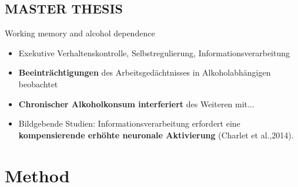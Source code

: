 \documentclass{bredelebeamer}
\begin{document}
\subsection{MASTER THESIS}
	\begin{frame}{Working memory and alcohol dependence}

	\begin{itemize}
	\item Exekutive Verhaltenskontrolle, Selbstregulierung, Informationsverarbeitung
  	\item \textbf{Beeinträchtigungen} des Arbeitsgedächtnisses in Alkoholabhängigen beobachtet
  	  	\item \textbf {Chronischer Alkoholkonsum interferiert} des Weiteren mit...
  	 \item Bildgebende Studien: Informationsverarbeitung erfordert eine \textbf{kompensierende erhöhte neuronale Aktivierung} (Charlet et al.,2014\cite{Charlet.2014}).
 		\end{itemize}
 		\cite{Crews.2005} \cite{Dougherty.2016} \cite{Eberl.2013}
	\end{frame}

\section{Method}
\end{document}

